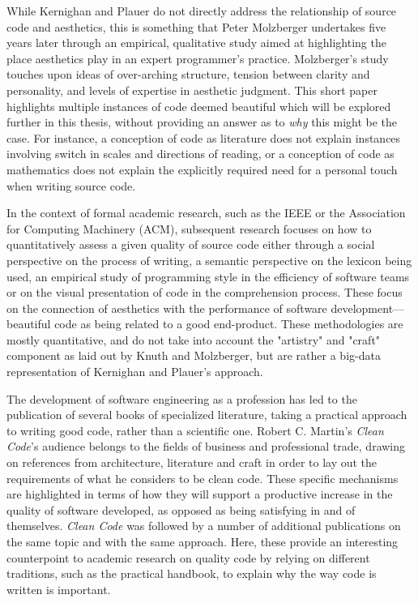 While Kernighan and Plauer do not directly address the relationship of source code and aesthetics, this is something that Peter Molzberger undertakes five years later through an empirical, qualitative study aimed at highlighting the place aesthetics play in an expert programmer's practice\cite{molzberger_aesthetics_1983}. Molzberger's study touches upon ideas of over-arching structure, tension between clarity and personality, and levels of expertise in aesthetic judgment. This short paper highlights multiple instances of code deemed beautiful which will be explored further in this thesis, without providing an answer as to \emph{why} this might be the case. For instance, a conception of code as literature does not explain instances involving switch in scales and directions of reading, or a conception of code as mathematics does not explain the explicitly required need for a personal touch when writing source code\cite{molzberger_aesthetics_1983}.

In the context of formal academic research, such as the IEEE or the Association for Computing Machinery (ACM), subsequent research focuses on how to quantitatively assess a given quality of source code either through a social perspective on the process of writing\cite{norick_effects_2010}, a semantic perspective on the lexicon being used\cite{fakhoury_improving_2019,guerrouj_normalizing_2013}, an empirical study of programming style in the efficiency of software teams\cite{reed_sometimes_2010,coleman_aesthetics_2018} or on the visual presentation of code in the comprehension process\cite{marcus_graphic_1982}. These focus on the connection of aesthetics with the performance of software development—beautiful code as being related to a good end-product. These methodologies are mostly quantitative, and do not take into account the "artistry" and "craft" component as laid out by Knuth and Molzberger, but are rather a big-data representation of Kernighan and Plauer's approach.

The development of software engineering as a profession has led to the publication of several books of specialized literature, taking a practical approach to writing good code, rather than a scientific one. Robert C. Martin's \emph{Clean Code}'s audience belongs to the fields of business and professional trade, drawing on references from architecture, literature and craft in order to lay out the requirements of what he considers to be clean code. These specific mechanisms are highlighted in terms of how they will support a productive increase in the quality of software developed, as opposed as being satisfying in and of themselves. \emph{Clean Code} was followed by a number of additional publications on the same topic and with the same approach\cite{fowler_refactoring_1999,arns_code_2005,hunt_pragmatic_1999}. Here, these provide an interesting counterpoint to academic research on quality code by relying on different traditions, such as the practical handbook, to explain why the way code is written is important.

